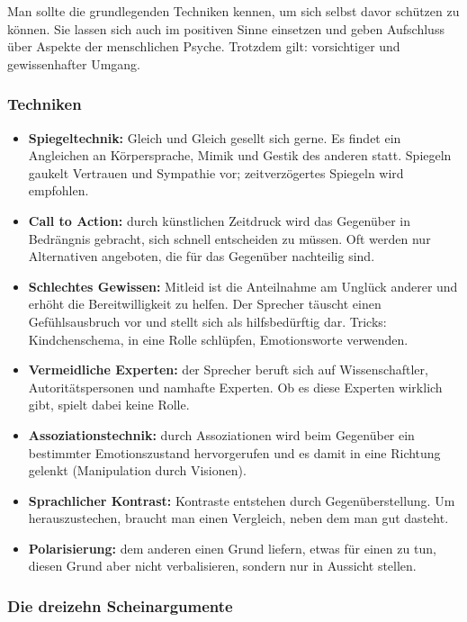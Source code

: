 \documentclass[12pt, a4paper]{article}
\begin{document}
Man sollte die grundlegenden Techniken kennen, um sich selbst davor schützen
zu können. Sie lassen sich auch im positiven Sinne einsetzen und geben
Aufschluss über Aspekte der menschlichen Psyche. Trotzdem gilt: vorsichtiger
und gewissenhafter Umgang.

\subsubsection{Techniken}

\begin{itemize}
  \item \textbf{Spiegeltechnik:} \glqq Gleich und Gleich gesellt sich
        gerne.\grqq{} Es findet ein Angleichen an Körpersprache, Mimik und
        Gestik des anderen statt. Spiegeln gaukelt Vertrauen und Sympathie
        vor; zeitverzögertes Spiegeln wird empfohlen.
  \item \textbf{Call to Action:} durch künstlichen Zeitdruck wird das
        Gegenüber in Bedrängnis gebracht, sich schnell entscheiden zu müssen.
        Oft werden nur Alternativen angeboten, die für das Gegenüber
        nachteilig sind.
  \item \textbf{Schlechtes Gewissen:} Mitleid ist die Anteilnahme am Unglück
        anderer und erhöht die Bereitwilligkeit zu helfen. Der Sprecher
        täuscht einen Gefühlsausbruch vor und stellt sich als hilfsbedürftig
        dar. Tricks: Kindchenschema, in eine Rolle schlüpfen,
        Emotionsworte verwenden.
  \item \textbf{Vermeidliche Experten:} der Sprecher beruft sich auf
        Wissenschaftler, Autoritätspersonen und namhafte Experten. Ob es
        diese Experten wirklich gibt, spielt dabei keine Rolle.
  \item \textbf{Assoziationstechnik:} durch Assoziationen wird beim Gegenüber
        ein bestimmter Emotionszustand hervorgerufen und es damit in eine
        Richtung gelenkt (Manipulation durch Visionen).
  \item \textbf{Sprachlicher Kontrast:} Kontraste entstehen durch
        Gegenüberstellung. Um herauszustechen, braucht man einen Vergleich,
        neben dem man gut dasteht.
  \item \textbf{Polarisierung:} dem anderen einen Grund liefern, etwas für
        einen zu tun, diesen Grund aber nicht verbalisieren, sondern nur in
        Aussicht stellen.
\end{itemize}

\subsubsection{Die dreizehn Scheinargumente}
\end{document}
